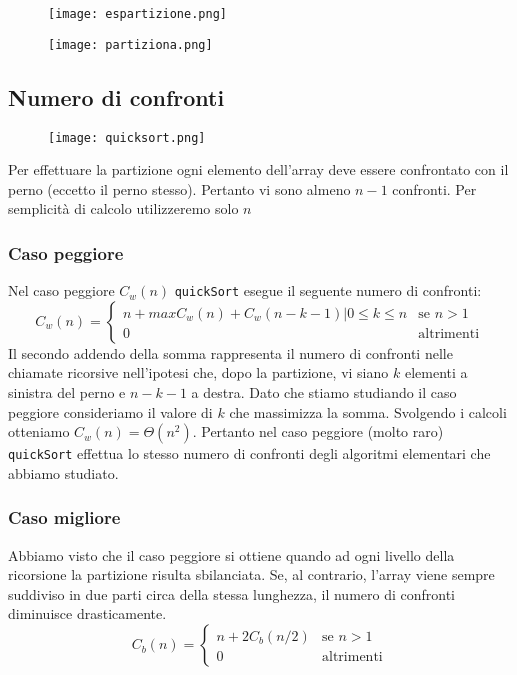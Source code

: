 \begin{figure}[h]
    \texttt{[image: espartizione.png]}
\end{figure}

\begin{figure}[h]
    \texttt{[image: partiziona.png]}
\end{figure}
\clearpage

\subsection*{Numero di confronti}

\begin{figure}[h]
    \texttt{[image: quicksort.png]}
\end{figure}

Per effettuare la partizione ogni elemento dell'array deve essere confrontato con il perno
(eccetto il perno stesso). Pertanto vi sono almeno $n - 1$ confronti. Per semplicità di calcolo
utilizzeremo solo $n$\\

\subsubsection*{Caso peggiore}
Nel caso peggiore $C_{w}(n)$ {\texttt{quickSort}} esegue il seguente numero di confronti:
\begin{equation*}
    C_{w}(n) = \begin{cases}
        n + max{C_{w}(n) + C_{w}(n-k-1) | 0 \le k \le n} & \text{se $n > 1$}\\
        0 & \text{altrimenti}
    \end{cases}
\end{equation*}
Il secondo addendo della somma rappresenta il numero di confronti nelle chiamate 
ricorsive nell'ipotesi che, dopo la partizione, vi siano $k$ elementi a sinistra
del perno e $n-k-1$ a destra. Dato che stiamo studiando il caso peggiore 
consideriamo il valore di $k$ che massimizza la somma. Svolgendo i calcoli otteniamo
$C_{w}(n) = \Theta(n^2)$. Pertanto nel caso peggiore (molto raro) {\texttt{quickSort}}
effettua lo stesso numero di confronti degli algoritmi elementari che abbiamo studiato.

\subsubsection*{Caso migliore}
Abbiamo visto che il caso peggiore si ottiene quando ad ogni livello della ricorsione
la partizione risulta sbilanciata. Se, al contrario, l'array viene sempre suddiviso
in due parti circa della stessa lunghezza, il numero di confronti diminuisce drasticamente.
\begin{equation*}
    C_{b}(n) = \begin{cases}
        n + 2C_{b}(n/2) & \text{se $n > 1$}\\
        0 & \text{altrimenti}
    \end{cases}
\end{equation*}

